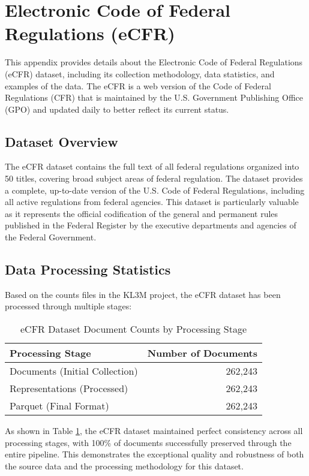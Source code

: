 \section{Electronic Code of Federal Regulations (eCFR)}
\label{appendix:ecfr}

This appendix provides details about the Electronic Code of Federal Regulations (eCFR) dataset, including its collection methodology, data statistics, and examples of the data. The eCFR is a web version of the Code of Federal Regulations (CFR) that is maintained by the U.S. Government Publishing Office (GPO) and updated daily to better reflect its current status.

\subsection{Dataset Overview}

The eCFR dataset contains the full text of all federal regulations organized into 50 titles, covering broad subject areas of federal regulation. The dataset provides a complete, up-to-date version of the U.S. Code of Federal Regulations, including all active regulations from federal agencies. This dataset is particularly valuable as it represents the official codification of the general and permanent rules published in the Federal Register by the executive departments and agencies of the Federal Government.

\subsection{Data Processing Statistics}

Based on the counts files in the KL3M project, the eCFR dataset has been processed through multiple stages:

\begin{table}[h]
\centering
\begin{tabular}{|l|r|}
\hline
\textbf{Processing Stage} & \textbf{Number of Documents} \\
\hline
Documents (Initial Collection) & 262,243 \\
Representations (Processed) & 262,243 \\
Parquet (Final Format) & 262,243 \\
\hline
\end{tabular}
\caption{eCFR Dataset Document Counts by Processing Stage}
\label{tab:ecfr_counts}
\end{table}

As shown in Table \ref{tab:ecfr_counts}, the eCFR dataset maintained perfect consistency across all processing stages, with 100\% of documents successfully preserved through the entire pipeline. This demonstrates the exceptional quality and robustness of both the source data and the processing methodology for this dataset.

